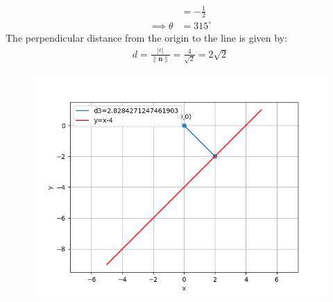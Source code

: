 \documentclass[12pt]{article}
\providecommand{\norm}[1]{\left\lVert#1\right\rVert}
\let\vec\mathbf
\begin{document}
\begin{enumerate}
\begin{align}
			&=-\frac{1}{2}\\
			\implies	\theta&=315^\circ
                \end{align}                                                                           The perpendicular distance from the origin to the line is given by:                                          \begin{align}
			d=\frac{|c|}{\norm{\vec{n}}}=\frac{4}{\sqrt{2}}=2\sqrt{2}                       
                  \end{align}
\begin{figure}[H]
	\begin{center} 
	    \includegraphics[width=\columnwidth]{./figs/line3.png}
	\end{center}
\caption{}
\label{fig:Fig3}
\end{figure}
\end{enumerate}
\end{document}

